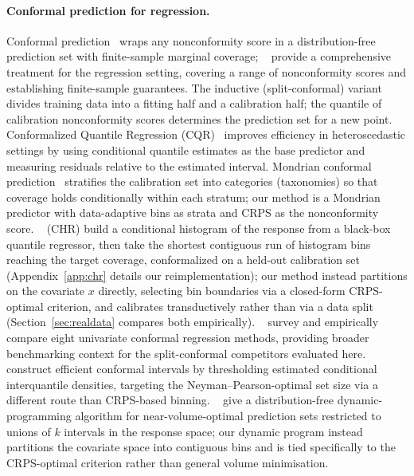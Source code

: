 \documentclass[11pt]{article}
\begin{document}
\paragraph{Conformal prediction for regression.}
Conformal prediction~\citep{VovkEtAl2022} wraps any nonconformity score in a
distribution-free prediction set with finite-sample marginal coverage;
~\citet{LeiEtAl2018} provide a comprehensive treatment for the regression
setting, covering a range of nonconformity scores and establishing finite-sample guarantees.
The inductive (split-conformal) variant~\citep{Papadopoulos2002} divides training data into
a fitting half and a calibration half; the quantile of calibration nonconformity scores
determines the prediction set for a new point.
Conformalized Quantile Regression (CQR)~\citep{RomanoEtAl2019} improves efficiency in
heteroscedastic settings by using conditional quantile estimates as the base predictor and
measuring residuals relative to the estimated interval.
Mondrian conformal prediction~\citep{VovkEtAl2022} stratifies the calibration set into
categories (tax\-onomies) so that coverage holds conditionally within each stratum; our
method is a Mondrian predictor with data-adaptive bins as strata and CRPS as the
nonconformity score.
~\citet{SesiaRomano2021} (CHR) build a conditional histogram of the response from a
black-box quantile regressor, then take the shortest contiguous run of histogram bins
reaching the target coverage, conformalized on a held-out calibration set
(Appendix~\ref{app:chr} details our reimplementation); our method instead partitions on
the covariate $x$ directly, selecting bin boundaries via a closed-form CRPS-optimal
criterion, and calibrates transductively rather than via a data split
(Section~\ref{sec:realdata} compares both empirically).
~\citet{BaoEtAl2025} survey and empirically compare eight univariate conformal
regression methods, providing broader benchmarking context for the split-conformal
competitors evaluated here.
~\citet{LuoZhou2025} construct efficient conformal intervals by thresholding
estimated conditional interquantile densities, targeting the Neyman--Pearson-optimal
set size via a different route than CRPS-based binning.
~\citet{GaoEtAl2025} give a distribution-free dynamic-programming algorithm for
near-volume-optimal prediction sets restricted to unions of $k$ intervals in the
response space; our dynamic program instead partitions the covariate space into
contiguous bins and is tied specifically to the CRPS-optimal criterion rather than
general volume minimisation.
\end{document}
